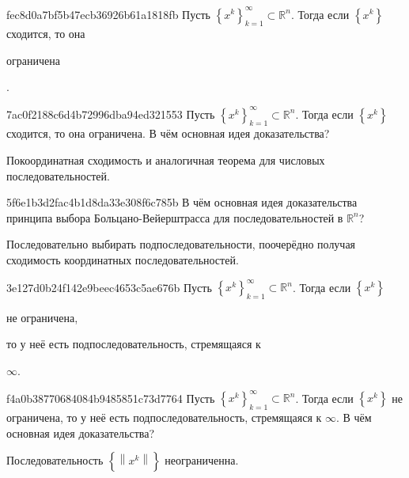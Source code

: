 \begin{note}{fec8d0a7bf5b47ecb36926b61a1818fb}
    Пусть \({ \left\{ x^{k} \right\}_{k = 1}^{\infty} \subset \mathbb R^{n} }\).
    Тогда если \({ \left\{ x^{k} \right\} }\) сходится, то она \begin{icloze}{1}ограничена\end{icloze}.
\end{note}

\begin{note}{7ac0f2188c6d4b72996dba94ed321553}
    Пусть \({ \left\{ x^{k} \right\}_{k = 1}^{\infty} \subset \mathbb R^{n} }\).
    Тогда если \({ \left\{ x^{k} \right\} }\) сходится, то она ограничена.
    В чём основная идея доказательства?

    \begin{cloze}{1}
        Покоординатная сходимость и аналогичная теорема для числовых последовательностей.
    \end{cloze}
\end{note}

\begin{note}{5f6e1b3d2fac4b1d8da33e308f6c785b}
    В чём основная идея доказательства принципа выбора Боль\-ца\-но-Вейерштрасса для последовательностей в \({ \mathbb R^{n} }\)?

    \begin{cloze}{1}
        Последовательно выбирать подпоследовательности, поочерёдно получая сходимость координатных последовательностей.
    \end{cloze}
\end{note}

\begin{note}{3e127d0b24f142e9beec4653c5ae676b}
    Пусть \({ \left\{ x^{k} \right\}_{k = 1}^{\infty} \subset \mathbb R^{n} }\).
    Тогда если \({ \left\{ x^{k} \right\} }\) \begin{icloze}{2}не ограничена,\end{icloze} то у неё есть подпоследовательность, стремящаяся к \begin{icloze}{1}\({ \infty }\).\end{icloze}
\end{note}

\begin{note}{f4a0b38770684084b9485851c73d7764}
    Пусть \({ \left\{ x^{k} \right\}_{k = 1}^{\infty} \subset \mathbb R^{n} }\).
    Тогда если \({ \left\{ x^{k} \right\} }\) не ограничена, то у неё есть подпоследовательность, стремящаяся к \({ \infty }\).
    В чём основная идея доказательства?

    \begin{cloze}{1}
        Последовательность \({ \left\{ \left\lVert x^{k} \right\rVert \right\} }\) неограниченна.
    \end{cloze}
\end{note}

